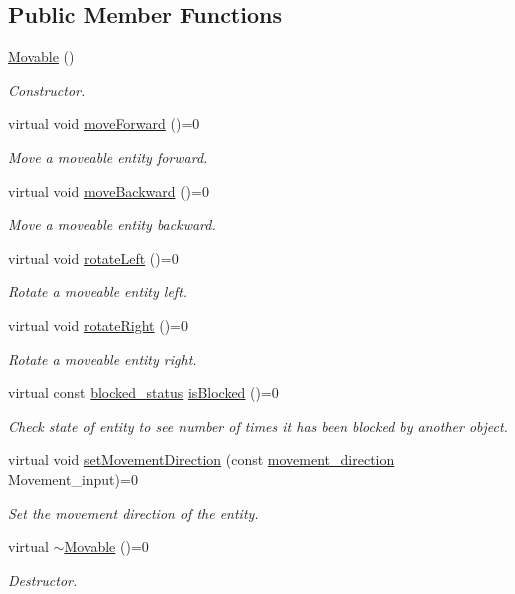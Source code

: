 \subsection*{Public Member Functions}
\begin{DoxyCompactItemize}
\item 
\hyperlink{classMovable_a053cf48796f1aef5b6f6cb4c6b22db78}{Movable} ()
\begin{DoxyCompactList}\small\item\em Constructor. \end{DoxyCompactList}\item 
virtual void \hyperlink{classMovable_adefaf61339698c5efec597529bf89310}{move\-Forward} ()=0
\begin{DoxyCompactList}\small\item\em Move a moveable entity forward. \end{DoxyCompactList}\item 
virtual void \hyperlink{classMovable_a9c03e7ac263902159579d7f83e9b6dee}{move\-Backward} ()=0
\begin{DoxyCompactList}\small\item\em Move a moveable entity backward. \end{DoxyCompactList}\item 
virtual void \hyperlink{classMovable_a422b71ade02b9034600f51bc55d58c90}{rotate\-Left} ()=0
\begin{DoxyCompactList}\small\item\em Rotate a moveable entity left. \end{DoxyCompactList}\item 
virtual void \hyperlink{classMovable_a821480cb8ffd047b39a907c6cf07dd84}{rotate\-Right} ()=0
\begin{DoxyCompactList}\small\item\em Rotate a moveable entity right. \end{DoxyCompactList}\item 
virtual const \hyperlink{Structures_8h_a6fef29d9424addfa69bdd2a379424896}{blocked\-\_\-status} \hyperlink{classMovable_a40db320f27f5be1882553298677702c8}{is\-Blocked} ()=0
\begin{DoxyCompactList}\small\item\em Check state of entity to see number of times it has been blocked by another object. \end{DoxyCompactList}\item 
virtual void \hyperlink{classMovable_a0bb485f10776845305a683ed5e2ba1fc}{set\-Movement\-Direction} (const \hyperlink{Structures_8h_a0d0b88f27f3adf9452879b5d9f829026}{movement\-\_\-direction} Movement\-\_\-input)=0
\begin{DoxyCompactList}\small\item\em Set the movement direction of the entity. \end{DoxyCompactList}\item 
virtual \hyperlink{classMovable_ae629c22458180741deb4b67b9523c794}{$\sim$\-Movable} ()=0
\begin{DoxyCompactList}\small\item\em Destructor. \end{DoxyCompactList}\end{DoxyCompactItemize}
